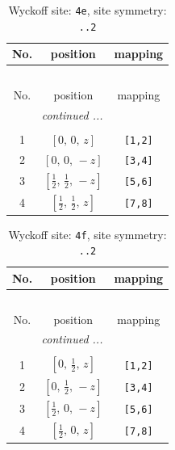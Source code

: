 \documentclass[fleqn,8pt]{jsarticle}
\begin{document}
\begin{longtable}{ccc}
\caption{Wyckoff site: {\tt 4e}, site symmetry: {\tt ..2}}
 \\
 \hline \hline
No. & position & mapping \\ \hline \endfirsthead

\multicolumn{2}{l}{\tablename\ \thetable{}} \\
 \hline \hline
No. & position & mapping \\ \hline \endhead

 \hline \hline
\multicolumn{2}{r}{\footnotesize\it continued ...} \\ \endfoot

 \hline \hline
\multicolumn{2}{r}{} \\ \endlastfoot

1 & $\left[ 0,\, 0,\, z \right]$ & {\tt [1,2]} \\ \hline
2 & $\left[ 0,\, 0,\, - z \right]$ & {\tt [3,4]} \\ \hline
3 & $\left[ \frac{1}{2},\, \frac{1}{2},\, - z \right]$ & {\tt [5,6]} \\ \hline
4 & $\left[ \frac{1}{2},\, \frac{1}{2},\, z \right]$ & {\tt [7,8]} \\
\end{longtable}
\renewcommand{\arraystretch}{1.2}
\begin{longtable}{ccc}
\caption{Wyckoff site: {\tt 4f}, site symmetry: {\tt ..2}}
 \\
 \hline \hline
No. & position & mapping \\ \hline \endfirsthead

\multicolumn{2}{l}{\tablename\ \thetable{}} \\
 \hline \hline
No. & position & mapping \\ \hline \endhead

 \hline \hline
\multicolumn{2}{r}{\footnotesize\it continued ...} \\ \endfoot

 \hline \hline
\multicolumn{2}{r}{} \\ \endlastfoot

1 & $\left[ 0,\, \frac{1}{2},\, z \right]$ & {\tt [1,2]} \\ \hline
2 & $\left[ 0,\, \frac{1}{2},\, - z \right]$ & {\tt [3,4]} \\ \hline
3 & $\left[ \frac{1}{2},\, 0,\, - z \right]$ & {\tt [5,6]} \\ \hline
4 & $\left[ \frac{1}{2},\, 0,\, z \right]$ & {\tt [7,8]} \\
\end{longtable}
\end{document}
